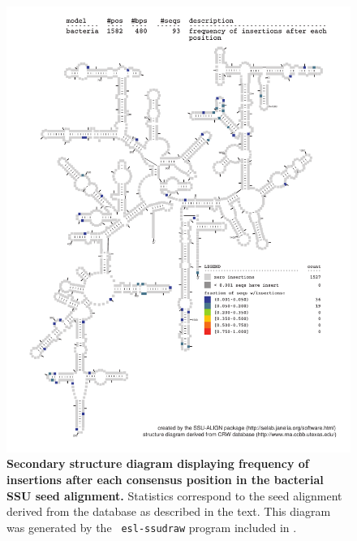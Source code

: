 \begin{figure}
\begin{center}
\includegraphics[width=5.7in]{Figures/bacteria-0p1-ifreq}
\end{center}
\caption[Secondary structure diagram displaying frequency of insertions
  after each consensus position in the bacterial SSU seed
  alignment]{\textbf{Secondary structure diagram displaying frequency
  of insertions after each consensus position in the bacterial SSU seed
  alignment.} Statistics correspond to the  seed
  alignment derived from the  database \cite{CannoneGutell02}
  as described in the text. This diagram was generated by the {\tt
  esl-ssudraw} program included in .}
\label{fig:bacifreq}
\end{figure}


